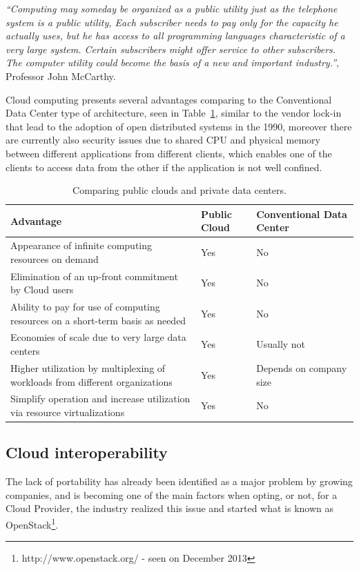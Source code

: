   \textit{``Computing may someday be organized as a public utility just as the telephone system is a public utility, Each subscriber needs to pay only for the capacity he actually uses, but he has access to all programming languages characteristic of a very large system. Certain subscribers might offer service to other subscribers. The computer utility could become the basis of a new and important industry.''}, Professor John McCarthy.

Cloud computing presents several advantages comparing to the Conventional Data Center type of architecture\cite{Armbrust}, seen in Table~\ref{tbl:advantagesofcloudcomputing}, similar to the vendor lock-in that lead to the adoption of open distributed systems in the 1990, moreover there are currently also security issues due to shared CPU and physical memory between different applications from different clients, which enables one of the clients to access data from the other if the application is not well confined.

\begin{table}
  \centering
  \begin{tabular}{| p{11cm} | p{2cm} | p{2cm} |}
  \hline 
  Advantage & Public Cloud & Conventional Data Center \\
  \hline 
  Appearance of infinite computing resources on demand & Yes & No \\
  \hline 
  Elimination of an up-front commitment by Cloud users & Yes & No \\
  \hline 
  Ability to pay for use of computing resources on a short-term basis as needed & Yes & No \\
  \hline 
  Economies of scale due to very large data centers & Yes & Usually not \\
  \hline 
  Higher utilization by multiplexing of workloads from different organizations & Yes & Depends on company size \\
  \hline 
  Simplify operation and increase utilization via resource virtualizations & Yes & No \\
  \hline  
  \end{tabular}
  \caption{Comparing public clouds and private data centers.}
  \label{tbl:advantagesofcloudcomputing}
\end{table}

\subsection{Cloud interoperability}
The lack of portability has already been identified as a major problem by growing companies, and is becoming one of the main factors when opting, or not, for a Cloud Provider, the industry realized this issue and started what is known as OpenStack\footnote{http://www.openstack.org/ - seen on December 2013}.

